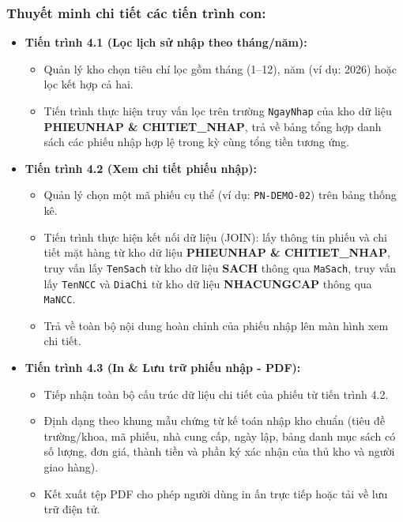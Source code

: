 \documentclass[12pt,a4paper]{article}
\begin{document}
\subsubsection*{Thuyết minh chi tiết các tiến trình con:}
\begin{itemize}
    \item \textbf{Tiến trình 4.1 (Lọc lịch sử nhập theo tháng/năm):}
    \begin{itemize}
        \item Quản lý kho chọn tiêu chí lọc gồm tháng (1--12), năm (ví dụ: 2026) hoặc lọc kết hợp cả hai.
        \item Tiến trình thực hiện truy vấn lọc trên trường \texttt{NgayNhap} của kho dữ liệu \textbf{PHIEUNHAP \& CHITIET\_NHAP}, trả về bảng tổng hợp danh sách các phiếu nhập hợp lệ trong kỳ cùng tổng tiền tương ứng.
    \end{itemize}

    \item \textbf{Tiến trình 4.2 (Xem chi tiết phiếu nhập):}
    \begin{itemize}
        \item Quản lý chọn một mã phiếu cụ thể (ví dụ: \texttt{PN-DEMO-02}) trên bảng thống kê.
        \item Tiến trình thực hiện kết nối dữ liệu (JOIN): lấy thông tin phiếu và chi tiết mặt hàng từ kho dữ liệu \textbf{PHIEUNHAP \& CHITIET\_NHAP}, truy vấn lấy \texttt{TenSach} từ kho dữ liệu \textbf{SACH} thông qua \texttt{MaSach}, truy vấn lấy \texttt{TenNCC} và \texttt{DiaChi} từ kho dữ liệu \textbf{NHACUNGCAP} thông qua \texttt{MaNCC}.
        \item Trả về toàn bộ nội dung hoàn chỉnh của phiếu nhập lên màn hình xem chi tiết.
    \end{itemize}

    \item \textbf{Tiến trình 4.3 (In \& Lưu trữ phiếu nhập - PDF):}
    \begin{itemize}
        \item Tiếp nhận toàn bộ cấu trúc dữ liệu chi tiết của phiếu từ tiến trình 4.2.
        \item Định dạng theo khung mẫu chứng từ kế toán nhập kho chuẩn (tiêu đề trường/khoa, mã phiếu, nhà cung cấp, ngày lập, bảng danh mục sách có số lượng, đơn giá, thành tiền và phần ký xác nhận của thủ kho và người giao hàng).
        \item Kết xuất tệp PDF cho phép người dùng in ấn trực tiếp hoặc tải về lưu trữ điện tử.
    \end{itemize}
\end{itemize}
\end{document}
